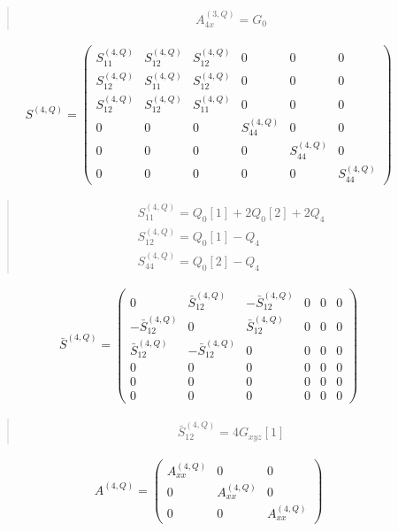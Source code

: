 \documentclass[fleqn,10pt]{jsarticle}
\begin{document}
\begin{quote}
\begin{align*}
& A^{(3,Q)}_{4x} = G_{0}
\end{align*}
\end{quote}
\begin{align*}
S^{(4,Q)} = \begin{pmatrix} S^{(4,Q)}_{11} & S^{(4,Q)}_{12} & S^{(4,Q)}_{12} & 0 & 0 & 0 \\ S^{(4,Q)}_{12} & S^{(4,Q)}_{11} & S^{(4,Q)}_{12} & 0 & 0 & 0 \\ S^{(4,Q)}_{12} & S^{(4,Q)}_{12} & S^{(4,Q)}_{11} & 0 & 0 & 0 \\ 0 & 0 & 0 & S^{(4,Q)}_{44} & 0 & 0 \\ 0 & 0 & 0 & 0 & S^{(4,Q)}_{44} & 0 \\ 0 & 0 & 0 & 0 & 0 & S^{(4,Q)}_{44} \end{pmatrix}
\end{align*}
\begin{quote}
\begin{align*}
& S^{(4,Q)}_{11} = Q_{0}[1] + 2 Q_{0}[2] + 2 Q_{4} \\
& S^{(4,Q)}_{12} = Q_{0}[1] - Q_{4} \\
& S^{(4,Q)}_{44} = Q_{0}[2] - Q_{4}
\end{align*}
\end{quote}
\begin{align*}
\bar{S}^{(4,Q)} = \begin{pmatrix} 0 & \bar{S}^{(4,Q)}_{12} & - \bar{S}^{(4,Q)}_{12} & 0 & 0 & 0 \\ - \bar{S}^{(4,Q)}_{12} & 0 & \bar{S}^{(4,Q)}_{12} & 0 & 0 & 0 \\ \bar{S}^{(4,Q)}_{12} & - \bar{S}^{(4,Q)}_{12} & 0 & 0 & 0 & 0 \\ 0 & 0 & 0 & 0 & 0 & 0 \\ 0 & 0 & 0 & 0 & 0 & 0 \\ 0 & 0 & 0 & 0 & 0 & 0 \end{pmatrix}
\end{align*}
\begin{quote}
\begin{align*}
& \bar{S}^{(4,Q)}_{12} = 4 G_{xyz}[1]
\end{align*}
\end{quote}
\begin{align*}
A^{(4,Q)} = \begin{pmatrix} A^{(4,Q)}_{xx} & 0 & 0 \\ 0 & A^{(4,Q)}_{xx} & 0 \\ 0 & 0 & A^{(4,Q)}_{xx} \end{pmatrix}
\end{align*}
\end{document}

